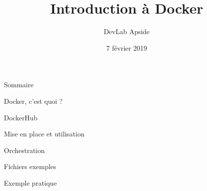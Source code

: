 \documentclass{beamer}
\title{Introduction à Docker}
\subtitle{DevLab Apside}
\date{7 février 2019}
\begin{document}
\begin{frame}
  \titlepage
\end{frame}

\begin{frame}[noframenumbering]{Sommaire}
    \tableofcontents
\end{frame}

\begin{section}{Docker, c'est quoi ?}
    
\end{section}


\begin{section}{DockerHub}
    
\end{section}


\begin{section}{Mise en place et utilisation}
    
\end{section}

\begin{section}{Orchestration}
    
\end{section}

\begin{section}{Fichiers exemples}
    
\end{section}

\begin{section}{Exemple pratique}
    
\end{section}




\end{document}
